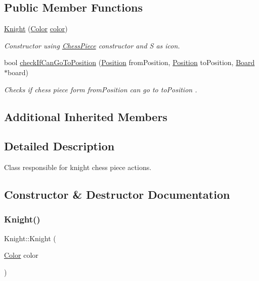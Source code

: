 \subsection*{Public Member Functions}
\begin{DoxyCompactItemize}
\item 
\hyperlink{classKnight_ac26ef96049f2e732b0adbc829b66939d}{Knight} (\hyperlink{Enums_8h_ab87bacfdad76e61b9412d7124be44c1c}{Color} \hyperlink{classChessPiece_a8c8fc170e7c719ac2b71a93a56a38f01}{color})
\begin{DoxyCompactList}\small\item\em Constructor using \hyperlink{classChessPiece}{Chess\+Piece} constructor and \textquotesingle{}S\textquotesingle{} as icon. \end{DoxyCompactList}\item 
bool \hyperlink{classKnight_a8aaec0101a97586e884332bf15787319}{check\+If\+Can\+Go\+To\+Position} (\hyperlink{classPosition}{Position} from\+Position, \hyperlink{classPosition}{Position} to\+Position, \hyperlink{classBoard}{Board} $\ast$board)
\begin{DoxyCompactList}\small\item\em Checks if chess piece form from\+Position can go to to\+Position . \end{DoxyCompactList}\end{DoxyCompactItemize}
\subsection*{Additional Inherited Members}


\subsection{Detailed Description}
Class responsible for knight chess piece actions. 

\subsection{Constructor \& Destructor Documentation}
\mbox{\label{classKnight_ac26ef96049f2e732b0adbc829b66939d}} 
\subsubsection{\texorpdfstring{Knight()}{Knight()}}
{\footnotesize\ttfamily Knight\+::\+Knight (\begin{DoxyParamCaption}\item[{\hyperlink{Enums_8h_ab87bacfdad76e61b9412d7124be44c1c}{Color}}]{color }\end{DoxyParamCaption})\hspace{0.3cm}{\ttfamily [inline]}}



